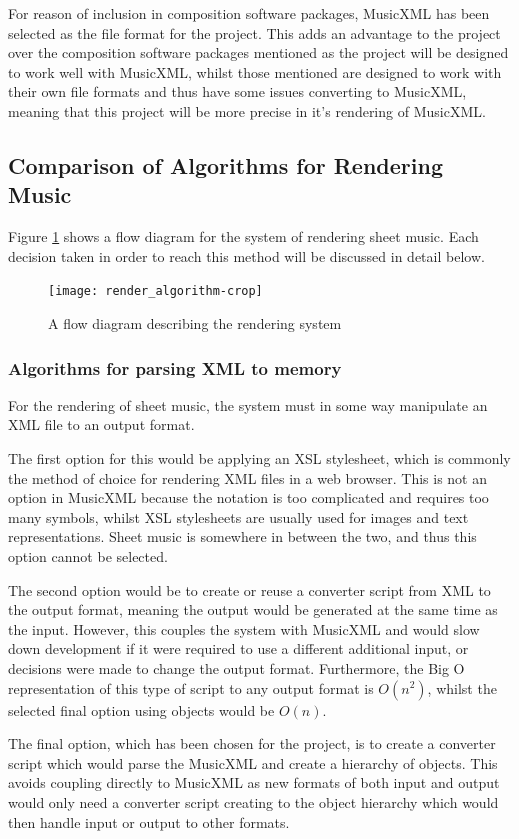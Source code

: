 For reason of inclusion in composition software packages, MusicXML has been selected as the file format for the project. This adds an advantage to the project over the composition software packages mentioned as the project will be designed to work well with MusicXML, whilst those mentioned are designed to work with their own file formats and thus have some issues converting to MusicXML\parencite{mscoreBugTracker}, meaning that this project will be more precise in it's rendering of MusicXML.

\subsection{Comparison of Algorithms for Rendering Music}
Figure \ref{fig:flow} shows a flow diagram for the system of rendering sheet music. Each decision taken in order to reach this method will be discussed in detail below.
\begin{figure}[H]
    \centering
    \texttt{[image: render\_algorithm-crop]}
    \caption{A flow diagram describing the rendering system}
    \label{fig:flow}
\end{figure}

\subsubsection{Algorithms for parsing XML to memory}
For the rendering of sheet music, the system must in some way manipulate an XML file to an output format.

The first option for this would be applying an XSL stylesheet, which is commonly the method of choice for rendering XML files in a web browser. This is not an option in MusicXML because the notation is too complicated and requires too many symbols, whilst XSL stylesheets are usually used for images and text representations. Sheet music is somewhere in between the two, and thus this option cannot be selected.

The second option would be to create or reuse a converter script from XML to the output format, meaning the output would be generated at the same time as the input. However, this couples the system with MusicXML and would slow down development if it were required to use a different additional input, or decisions were made to change the output format. Furthermore, the Big O representation of this type of script to any output format is $O(n^2)$, whilst the selected final option using objects would be $O(n)$.

The final option, which has been chosen for the project, is to create a converter script which would parse the MusicXML and create a hierarchy of objects. This avoids coupling directly to MusicXML as new formats of both input and output would only need a converter script creating to the object hierarchy which would then handle input or output to other formats.

